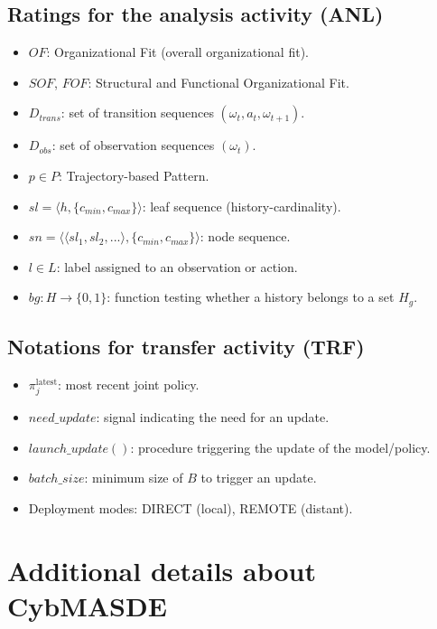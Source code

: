 \section{Ratings for the analysis activity (ANL)}
\begin{itemize}
       \item $OF$: Organizational Fit (overall organizational fit).
       \item $SOF$, $FOF$: Structural and Functional Organizational Fit.

       \item $D_{trans}$: set of transition sequences $(\omega_t, a_t, \omega_{t+1})$.
       \item $D_{obs}$: set of observation sequences $(\omega_t)$.
       \item $p \in P$: Trajectory-based Pattern.

       \item $sl = \langle h, \{c_{min},c_{max}\}\rangle$: leaf sequence (history-cardinality).
       \item $sn = \langle \langle sl_1, sl_2, ...\rangle, \{c_{min},c_{max}\}\rangle$: node sequence.

       \item $l \in L$: label assigned to an observation or action.
       \item $bg: H \to \{0,1\}$: function testing whether a history belongs to a set $H_g$.
\end{itemize}
\section{Notations for transfer activity (TRF)}
\begin{itemize}
       \item $\pi^{\text {latest}}_j$: most recent joint policy.
       \item $need\_update$: signal indicating the need for an update.
       \item $launch\_update()$: procedure triggering the update of the model/policy.

       \item $batch\_size$: minimum size of $B$ to trigger an update.
       \item Deployment modes: DIRECT (local), REMOTE (distant).
\end{itemize}
\clearpage
\thispagestyle{empty}
\null
\newpage
\chapter{Additional details about CybMASDE}
